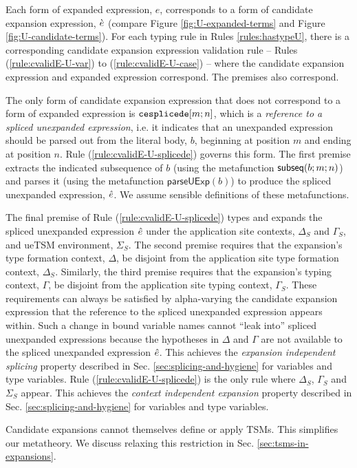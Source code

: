 Each form of expanded expression, $e$, corresponds to a form of candidate expansion expression, $\grave{e}$ (compare Figure \ref{fig:U-expanded-terms} and Figure \ref{fig:U-candidate-terms}). For each typing rule in Rules \ref{rules:hastypeU}, there is a corresponding candidate expansion expression validation rule -- Rules (\ref{rule:cvalidE-U-var}) to (\ref{rule:cvalidE-U-case}) -- where the candidate expansion expression and expanded expression correspond. The premises also correspond.

The only form of candidate expansion expression that does not correspond to a form of expanded expression is $\texttt{cesplicede}[m; n]$, which is a \emph{reference to a spliced unexpanded expression}, i.e. it indicates that an unexpanded expression should be parsed out from the literal body, $b$, beginning at position $m$ and ending at position $n$. Rule (\ref{rule:cvalidE-U-splicede}) governs this form. The first premise extracts the indicated subsequence of $b$ (using the metafunction $\mathsf{subseq}(b; m; n)$) and parses it (using the metafunction $\mathsf{parseUExp}(b)$) to produce the spliced unexpanded expression, $\hat{e}$. We assume sensible definitions of these metafunctions.

The final premise of Rule (\ref{rule:cvalidE-U-splicede}) types and expands the spliced unexpanded expression $\hat{e}$ under the application site contexts, $\Delta_S$ and $\Gamma_S$, and ueTSM environment, $\Sigma_S$. The second premise requires that the expansion's type formation context, $\Delta$, be disjoint from the application site type formation context, $\Delta_S$. Similarly, the third premise requires that the expansion's typing context, $\Gamma$, be disjoint from the application site typing context, $\Gamma_S$. These requirements can always be satisfied by alpha-varying the candidate expansion expression that the reference to the spliced unexpanded expression appears within. Such a change in bound variable names cannot ``leak into'' spliced unexpanded expressions because the hypotheses in $\Delta$ and $\Gamma$ are not  available to the spliced unexpanded expression $\hat{e}$. This achieves the \emph{expansion independent splicing} property described in Sec. \ref{sec:splicing-and-hygiene} for variables and type variables. Rule (\ref{rule:cvalidE-U-splicede}) is the only rule where $\Delta_S$, $\Gamma_S$ and $\Sigma_S$ appear. This achieves the \emph{context independent expansion} property described in Sec. \ref{sec:splicing-and-hygiene} for variables and type variables.

Candidate expansions cannot themselves define or apply TSMs. This simplifies our metatheory. We discuss relaxing this restriction in Sec. \ref{sec:tsms-in-expansions}.


